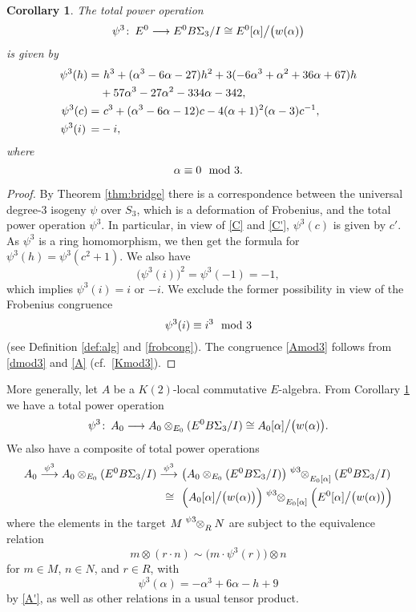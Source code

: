 \documentclass{gtpart}
\newtheorem{cor}[thm]{Corollary}
\theoremstyle{definition}
\theoremstyle{remark}
\def\co{\colon\thinspace}
\newcommand{\md}{~~{\rm mod}~}
\newcommand{\A}{\alpha}
\newcommand{\p}{\psi^3}
\numberwithin{equation}{section}
\numberwithin{thm}{section}
\begin{document}
\begin{cor}
\label{cor:psi3}
 The total power operation 
 \[
  \p \co E^0 \longrightarrow E^0 B\Sigma_3 / I 
  \cong E^0 [\A] \big/ \big( w(\A) \big) 
 \]
 is given by 
 \begin{equation*}
 \begin{split}
  \p(h) = & ~ h^3 + (\A^3 - 6 \A - 27) h^2 + 3 (-6 \A^3 + \A^2 + 36 \A + 67) h \\
          & + 57 \A^3 - 27 \A^2 - 334 \A - 342, \\
  \p(c) = & ~ c^3 + (\A^3 - 6 \A - 12) c - 4 (\A + 1)^2 (\A - 3) c^{-1}, \\
  \p(i) \thinspace = & -i, 
 \end{split}
 \end{equation*}
 where 
 \begin{equation}
 \label{Amod3}
  \A \equiv 0 \md 3.  
 \end{equation}
\end{cor}
\begin{proof}
 By Theorem \ref{thm:bridge} there is a correspondence between the 
 universal degree-3 isogeny $\psi$ over $S_3$, which is a deformation of 
 Frobenius, and the total power operation $\p$.  In particular, in view 
 of \eqref{C} and \eqref{C'}, $\p(c)$ is given by $c'$.  As $\p$ is a 
 ring homomorphism, we then get the formula for $\p(h) = \p(c^2 + 1)$.  
 We also have 
 \[
  \big( \p(i) \big)^2 = \p(-1) = -1, 
 \]
 which implies $\p(i) = i$ or $-i$.  We exclude the former possibility 
 in view of the Frobenius congruence 
 \[
  \p(i) \equiv i^3 \md 3 
 \]
 (see Definition \ref{def:alg} and \eqref{frobcong}).  The congruence 
 \eqref{Amod3} follows from \eqref{dmod3} and \eqref{A} 
 (cf.~\eqref{Kmod3}).  
\end{proof}

More generally, let $A$ be a $K(2)$-local commutative $E$-algebra.  
From Corollary \ref{cor:psi3} we have a total power operation 
\[
 \p \co A_0 \longrightarrow A_0 \otimes_{E_0} (E^0 B\Sigma_3 / I) 
 \cong A_0 [\A] \big/ \big( w(\A) \big).  
\]
We also have a composite of total power operations 
\begin{equation}
\label{psi3^2}
\begin{split}
 A_0 \stackrel{\p}{\longrightarrow} A_0 \otimes_{E_0} (E^0 B\Sigma_3 / I) \stackrel{\p}{\longrightarrow} 
 & ~ \big( A_0 \otimes_{E_0} (E^0 B\Sigma_3 / I) \big) \tensor[^\p]{\otimes}{_{E_0 [\A]}} (E^0 B\Sigma_3 / I) \\
 \cong \thinspace \thinspace & ~ \Big( A_0 [\A] \big/ \big( w(\A) \big) \Big) \tensor[^\p]{\otimes}{_{E_0 [\A]}} \Big( E^0 [\A] \big/ \big( w(\A) \big) \Big) 
\end{split}
\end{equation}
where the elements in the target $M \tensor[^\p]{\otimes}{_R} N$ are 
subject to the equivalence relation 
\[
 m \otimes (r \cdot n) \sim \big( m \cdot \p(r) \big) \otimes n 
\]
for $m \in M$, $n \in N$, and $r \in R$, with 
\[
 \p(\A) = -\A^3 + 6 \A - h + 9 
\]
by \eqref{A'}, as well as other relations in a usual tensor product.  
\end{document}
